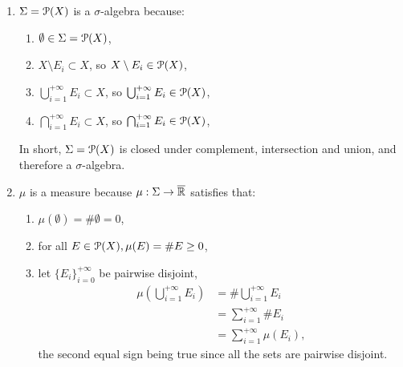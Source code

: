 \begin{enumerate}
    \item \(\Sigma = \mathcal{P}(X)\) is a \(\sigma\)-algebra because:
    \begin{enumerate}
        \item \(\emptyset \in \Sigma = \mathcal{P}(X)\),
        \item \(X \setminus E_i \subset X \), so \(X \setminus E_i \in \mathcal{P}(X)\),
        \item \(\bigcup_{i = 1}^{+\infty}E_i \subset X\), so \(\bigcup_{i = 1}^{+\infty}E_i \in \mathcal{P}(X)\),
        \item \(\bigcap_{i = 1}^{+\infty}E_i \subset X\), so \(\bigcap_{i = 1}^{+\infty}E_i \in \mathcal{P}(X)\),
    \end{enumerate}
    In short, \(\Sigma = \mathcal{P}(X)\) is closed under complement, intersection and union, and therefore a \(\sigma\)-algebra.
    \item \(\mu\) is a measure because \(\mu: \Sigma \to \overline{\mathbb{R}}\) satisfies that:
    \begin{enumerate}
        \item \(\mu(\emptyset) = \# \emptyset = 0\),
        \item for all \(E \in \mathcal{P}(X), \mu(E) = \# E \geq 0\),
        \item let \(\{E_i\}_{i = 0}^{+\infty}\) be pairwise disjoint,
        \begin{align*}
            \mu\left(\bigcup_{i = 1}^{+\infty} E_i\right) &= \# \bigcup_{i = 1}^{+\infty} E_i\\
            &= \sum_{i = 1}^{+\infty} \# E_i\\
            &= \sum_{i = 1}^{+\infty} \mu(E_i),
        \end{align*}
        the second equal sign being true since all the sets are pairwise disjoint.
    \end{enumerate}
\end{enumerate}